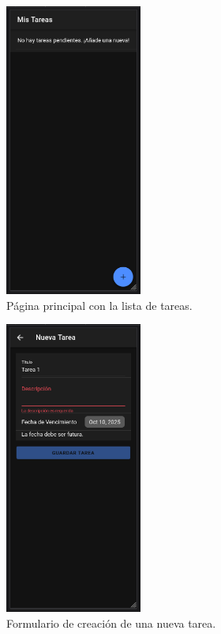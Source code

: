 \documentclass{article}
\begin{document}
\begin{figure}[htbp]
\centering
\includegraphics[width=0.4\textwidth]{captura_home.png}
\caption{P\'agina principal con la lista de tareas.}
\label{fig:home}
\end{figure}
\begin{figure}[htbp]
\centering
\includegraphics[width=0.4\textwidth]{captura_crear.png}
\caption{Formulario de creaci\'on de una nueva tarea.}
\label{fig:crear}
\end{figure}
\end{document}
